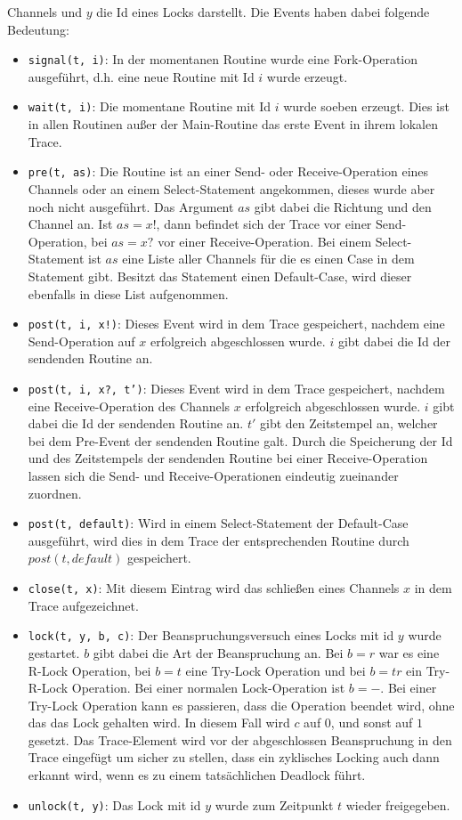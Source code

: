Channels und $y$ die Id eines Locks darstellt. Die Events haben dabei folgende Bedeutung:
\begin{itemize}
  \item \texttt{signal(t, i)}: In der momentanen Routine wurde
    eine Fork-Operation ausgeführt,
    d.h. eine neue Routine mit Id $i$ wurde erzeugt.
  \item \texttt{wait(t, i)}: Die momentane Routine mit Id $i$ wurde soeben erzeugt. Dies ist 
    in allen Routinen außer der Main-Routine das erste Event in ihrem lokalen Trace.
  \item \texttt{pre(t, as)}: Die Routine ist an einer Send- oder Receive-Operation eines 
    Channels oder an einem Select-Statement angekommen, dieses wurde aber noch nicht 
    ausgeführt. Das Argument $as$ gibt dabei die Richtung und den Channel an. 
    Ist $as = x!$, dann befindet sich der Trace vor einer Send-Operation, bei 
    $as = x?$ vor einer Receive-Operation. Bei einem Select-Statement ist 
    $as$ eine Liste aller Channels für die es einen 
    Case in dem Statement gibt. Besitzt das Statement einen Default-Case, wird
    dieser ebenfalls in diese List aufgenommen.
  \item \texttt{post(t, i, x!)}: Dieses Event wird in dem Trace gespeichert, nachdem 
    eine Send-Operation auf $x$ erfolgreich abgeschlossen wurde. 
    $i$ gibt dabei die Id der sendenden Routine an.
  \item \texttt{post(t, i, x?, t')}: Dieses Event wird in dem Trace gespeichert, nachdem 
    eine Receive-Operation des Channels $x$ erfolgreich abgeschlossen wurde. 
    $i$ gibt dabei die Id der sendenden Routine an. $t'$ gibt den Zeitstempel an,
    welcher bei dem Pre-Event der sendenden Routine galt. Durch die Speicherung der Id und des 
    Zeitstempels der sendenden Routine bei einer Receive-Operation lassen sich 
    die Send- und Receive-Operationen eindeutig zueinander zuordnen.
  \item \texttt{post(t, default)}: Wird in einem Select-Statement der Default-Case ausgeführt,
    wird dies in dem Trace der entsprechenden Routine durch $post(t, default)$ 
    gespeichert.
  \item \texttt{close(t, x)}: Mit diesem Eintrag wird das schließen eines Channels $x$ 
    in dem Trace aufgezeichnet.
  \item \texttt{lock(t, y, b, c)}: Der Beanspruchungsversuch eines Locks mit id $y$ wurde gestartet. 
    $b$ gibt dabei die Art der Beanspruchung an. Bei $b = r$ war es eine R-Lock
    Operation, bei $b = t$ eine Try-Lock Operation und bei $b = tr$ ein Try-R-Lock
    Operation. Bei einer normalen Lock-Operation ist $b = -$. Bei einer 
    Try-Lock Operation kann es passieren, dass die Operation beendet wird, 
    ohne das das Lock gehalten wird. In diesem Fall wird $c$ auf $0$, und 
    sonst auf $1$ gesetzt. Das Trace-Element wird vor der abgeschlossen 
    Beanspruchung in den Trace eingefügt um sicher zu stellen, dass 
    ein zyklisches Locking auch dann erkannt wird, wenn es zu einem 
    tatsächlichen Deadlock führt. 
  \item \texttt{unlock(t, y)}: Das Lock mit id $y$ wurde zum Zeitpunkt 
    $t$ wieder freigegeben. 
\end{itemize}


